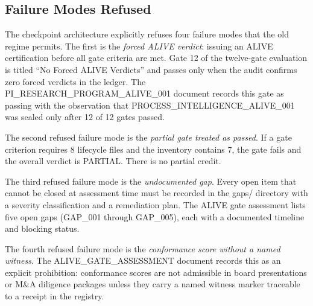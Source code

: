 \subsection{Failure Modes Refused}
\label{sec:checkpoints-architecture-failure-modes}

The checkpoint architecture explicitly refuses four failure modes that the old regime permits. The
first is the \emph{forced ALIVE verdict}: issuing an ALIVE certification before all gate criteria are
met. Gate 12 of the twelve-gate evaluation is titled \textquotedblleft No Forced ALIVE
Verdicts\textquotedblright{} and passes only when the audit confirms zero forced verdicts in the
ledger. The PI\_RESEARCH\_PROGRAM\_ALIVE\_001 document records this gate as passing with the
observation that PROCESS\_INTELLIGENCE\_ALIVE\_001 was sealed only after 12 of 12 gates passed.

The second refused failure mode is the \emph{partial gate treated as passed}. If a gate criterion
requires 8 lifecycle files and the inventory contains 7, the gate fails and the overall verdict is
PARTIAL. There is no partial credit.

The third refused failure mode is the \emph{undocumented gap}. Every open item that cannot be closed
at assessment time must be recorded in the gaps/ directory with a severity classification and a
remediation plan. The ALIVE gate assessment lists five open gaps (GAP\_001 through GAP\_005), each
with a documented timeline and blocking status.

The fourth refused failure mode is the \emph{conformance score without a named witness}. The
ALIVE\_GATE\_ASSESSMENT document records this as an explicit prohibition: conformance scores are not
admissible in board presentations or M\&A diligence packages unless they carry a named witness
marker traceable to a receipt in the registry.
